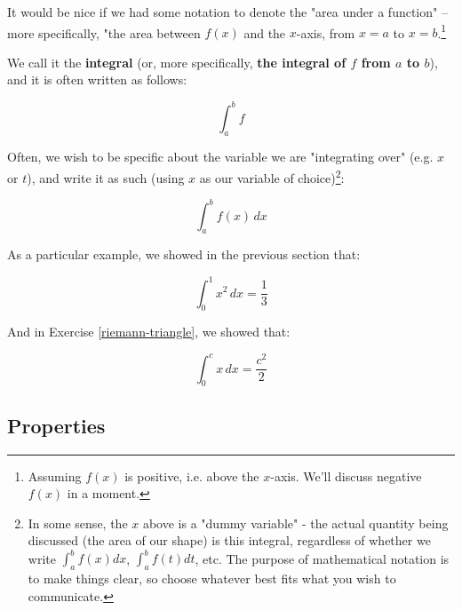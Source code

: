 \documentclass{article}
\begin{document}
It would be nice if we had some notation to denote the "area under a function" -- more specifically, "the area between $f(x)$ and the $x$-axis, from $x = a$ to $x = b$.\footnote{Assuming $f(x)$ is positive, i.e. above the $x$-axis. We'll discuss negative $f(x)$ in a moment.} 


We call it the \textbf{integral} (or, more specifically, \textbf{the integral of $f$ from $a$ to $b$}), and it is often written as follows:

\begin{equation}
\int_{a}^{b} f
\end{equation}

Often, we wish to be specific about the variable we are "integrating over" (e.g. $x$ or $t$), and write it as such (using $x$ as our variable of choice)\footnote{In some sense, the $x$ above is a "dummy variable" - the actual quantity being discussed (the area of our shape) is this integral, regardless of whether we write $\int_{a}^{b} f(x) dx$, $\int_{a}^{b} f(t) dt$, etc. The purpose of mathematical notation is to make things clear, so choose whatever best fits what you wish to communicate.}:

\begin{equation}
\int_{a}^{b} f(x)\, dx
\end{equation}


As a particular example, we showed in the previous section that:

\begin{equation}
\int_{0}^{1} x^2\, dx = \frac{1}{3}
\end{equation}

And in Exercise \ref{riemann-triangle}, we showed that:

\begin{equation}
\int_{0}^{c} x\, dx = \frac{c^2}{2}
\end{equation}




\subsection{Properties}
\end{document}
